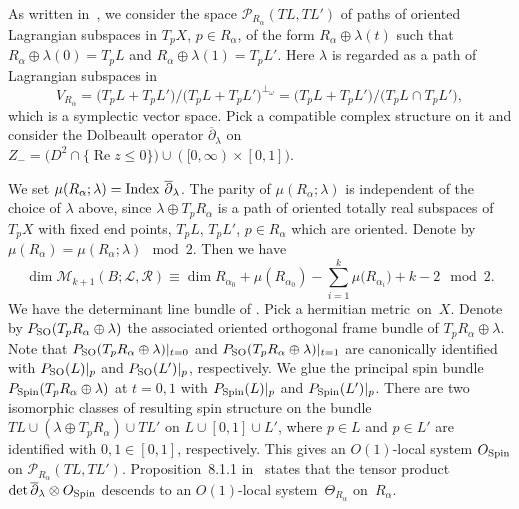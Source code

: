 \documentclass[pdftex]{sigma}
\numberwithin{equation}{section}
\theoremstyle{definition}
\begin{document}
As written in~\cite[Section 8.8]{FOOO09II}, we consider the space ${\mathcal P}_{R_\alpha} (TL, TL')$ of paths of oriented Lagrangian subspaces in $T_pX$, $p \in R_{\alpha}$,
of the form $R_{\alpha} \oplus \lambda (t)$ such that $R_{\alpha} \oplus \lambda (0) = T_p L$ and $R_{\alpha} \oplus \lambda (1) = T_p L'$.
Here $\lambda$ is regarded as a path of Lagrangian subspaces in
\[V_{R_{\alpha}}=\bigl(T_p L + T_p L'\bigr)/ \bigl(T_p L + T_p L'\bigr)^{\perp_{\omega}} = \bigl(T_p L + T_p L'\bigr)/\bigl(T_p L \cap T_p L'\bigr),
\]
which is
a symplectic vector space. Pick a compatible complex structure on it and consider the Dolbeault operator $\overline{\partial}_{\lambda}$ on $Z_- = \bigl(D^2 \cap \{\operatorname{Re} z \leq 0 \}\bigr) \cup ([0, \infty) \times [0,1])$.

We set $\mu(R_{\alpha};\lambda) = {\rm Index~} \overline{\partial}_{\lambda}$.
The parity of $\mu(R_{\alpha}; \lambda)$ is independent of the choice of $\lambda$ above, since $\lambda \oplus T_p R_{\alpha}$ is a path
of oriented totally real subspaces of $T_pX$ with fixed end points,
$T_p L$, $T_p L'$, $p \in R_{\alpha}$ which are oriented.
Denote by $\mu(R_{\alpha}) = \mu(R_{\alpha};\lambda) \mod 2$.
Then we have
\begin{equation}\label{dim moduli}
\dim  {\mathcal M}_{k+1}(B;{\mathcal L}, {\mathcal R}) \equiv \dim  R_{\alpha_0} + \mu(R_{\alpha_0}) - \sum_{i=1}^k \mu\bigl(R_{\alpha_i}\bigr) +k -2 \mod 2.
\end{equation}
We have the determinant line bundle of .
Pick a hermitian metric~on~$X$. Denote by $P_{\rm SO}(T_p R_{\alpha} \oplus \lambda) $ the associated oriented orthogonal frame bundle of
$T_p R_{\alpha} \oplus \lambda$.
Note that $P_{\rm SO}(T_p R_{\alpha} \oplus \lambda)\vert_{t=0}$ and $P_{\rm SO}(T_p R_{\alpha} \oplus \lambda)\vert_{t=1}$ are canonically identified with $P_{\rm SO}(L)\vert_p$ and
$P_{\rm SO}(L')\vert_p$, respectively.
We glue the principal spin bundle $P_{\rm Spin}(T_p R_{\alpha} \oplus \lambda)$ at $t=0, 1$ with $P_{\rm Spin}(L)\vert_p$ and $P_{\rm Spin}(L')\vert_p$.
There are two isomorphic classes of resulting spin structure on the bundle $TL \cup (\lambda \oplus T_p R_{\alpha}) \cup TL'$ on $L \cup [0,1] \cup L'$, where
$p \in L$ and $p \in L'$ are identified with ${0, 1 \in [0,1]}$, respectively.
This gives an $O(1)$-local system $O_{\rm Spin}$ on ${\mathcal P}_{R_{\alpha}}(TL, TL')$.
Proposition~8.1.1 in~\cite{FOOO09II} states that the tensor product $\det \overline{\partial}_{\lambda} \otimes O_{\rm Spin}$ descends to an $O(1)$-local system~$\Theta_{R_{\alpha}}$
on~$R_{\alpha}$.
\end{document}
